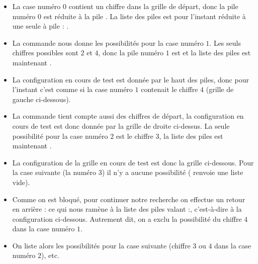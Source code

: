 \documentclass[11pt,class=report,crop=false]{standalone}
\begin{document}
\begin{cours}[Sudoku]
  
\begin{itemize}
  \item La case numéro $0$ contient un chiffre dans la grille de départ, donc la pile numéro $0$ est réduite à la pile \ci{[1]}. La liste des piles est pour l'instant réduite à une seule à pile : \ci{[ [1] ]}.
  
  \item La commande  nous donne les possibilités pour la case numéro $1$. Les seuls chiffres possibles sont $2$ et $4$, donc la pile numéro $1$ est \ci{[2,4]} et la liste des piles est maintenant \ci{[ [1], [2,4] ]}.
  
  \item La configuration en cours de test est donnée par le haut des piles, donc pour l'instant c'est comme si la case numéro $1$ contenait le chiffre $4$ (grille de gauche ci-dessous).
  
  \smallskip
   

  
  \item La commande  tient compte aussi des chiffres de départ, la configuration en cours de test est donc donnée par la grille de droite ci-dessus.
  La seule possibilité pour la case numéro $2$ est le chiffre $3$, la liste des piles est maintenant \ci{[ [1], [2,4], [3] ]}.
  
   \item La configuration de la grille en cours de test est donc la grille ci-dessous.
   Pour la case suivante (la numéro $3$) il n'y a aucune possibilité ( renvoie une liste vide).   
   
  \smallskip
  

   
   \item Comme on est bloqué, pour continuer notre recherche on effectue un retour en arrière : ce qui nous ramène à la liste des piles valant :\ci{[ [1], [2] ]}, c'est-à-dire à la configuration ci-dessous. Autrement dit, on a exclu la possibilité du chiffre $4$ dans la case numéro $1$.
  
  \smallskip
     

   
   \item On liste alors les possibilités pour la case suivante (chiffre $3$ ou $4$ dans la case numéro $2$), etc.
   

  
\end{itemize}

\end{cours}
\end{document}
